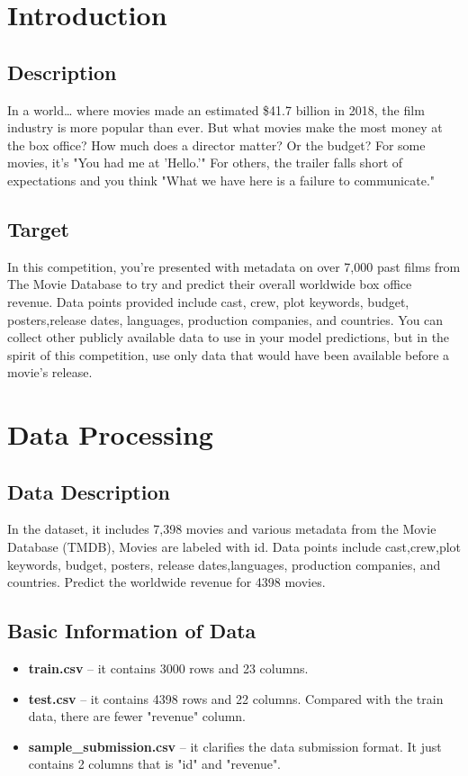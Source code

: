 \section{Introduction}\label{sec-intro}

\subsection{Description}
In a world… where movies made an estimated \$41.7 billion in 2018, 
the film industry is more popular than ever. 
But what movies make the most money at the box office? 
How much does a director matter? Or the budget? For some movies, 
it's "You had me at 'Hello.'" For others, 
the trailer falls short of expectations and you think "What we have here is a failure to communicate." 
\subsection{Target}
In this competition,
you're presented with metadata on over 7,000 past films from The Movie Database to try and predict their overall worldwide box office revenue.
 Data points provided include cast, crew, plot keywords, budget, posters,release dates, languages, production companies, and countries. 
 You can collect other publicly available data to use in your model predictions,
but in the spirit of this competition, use only data that would have been available before a movie's release. 

 \section{Data Processing} \label{sec-preliminaries}
 \subsection{Data Description}
In the dataset, it includes 7,398 movies and various metadata from the Movie Database (TMDB), Movies are labeled with id.
Data points include cast,crew,plot keywords, budget, posters, release dates,languages, production companies, and countries.
Predict the worldwide revenue for 4398 movies.

\subsection{Basic Information of Data}
\begin{itemize}
	\smallskip
	\item \textbf{train.csv} -- it contains 3000 rows and 23 columns.
	\smallskip
	\item \textbf{test.csv} -- it contains 4398 rows and 22 columns.
   Compared with the train data, there are fewer "revenue" column.
	\smallskip
	\item \textbf{sample\_submission.csv} -- it clarifies the data submission format.
   It just contains 2 columns that is "id" and "revenue".
\end{itemize}
